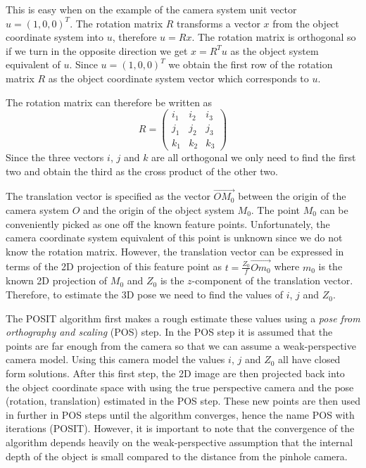 \documentclass[11pt,a4paper]{report}
\begin{document}
This is easy when on the
example of the camera system unit vector $u = (1,0,0)^T$. The rotation matrix
$R$ transforms a vector $x$ from the object coordinate system into $u$,
therefore $u = Rx$. The rotation matrix is orthogonal so if we turn in the
opposite direction we get $x = R^Tu$ as the object system equivalent of $u$. Since $u = (1,0,0)^T$ we obtain the first
row of the rotation matrix $R$ as the object coordinate system vector which
corresponds to $u$.

The rotation matrix can therefore be written as
\begin{equation}
R = \begin{pmatrix}i_1&i_2&i_3\\j_1&j_2&j_3\\k_1&k_2&k_3\end{pmatrix}
\end{equation}
Since the three vectors $i$, $j$ and $k$ are all orthogonal we only need to find the
first two and obtain the third as the cross product of the other two.

The translation vector is specified as the vector $\overrightarrow{OM_0}$ between the
origin of the camera system $O$ and the origin of the object system $M_0$. The
point $M_0$ can be conveniently picked as one off the known feature
points. Unfortunately, the
camera coordinate system equivalent of this point is unknown since we do not
know the rotation matrix. However, the translation vector can be expressed in
terms of the 2D projection of this feature point
as $t = \frac{Z_0}{f}\overrightarrow{Om_0}$ where $m_0$ is the known 2D projection of $M_0$
and $Z_0$ is the $z$-component of the translation vector. Therefore, to estimate
the 3D pose we need to find the values of $i$, $j$ and $Z_0$.

The POSIT algorithm first makes a rough estimate these values using a \textit{pose from
  orthography and scaling} (POS) step. In the POS step it is assumed that the
points are far enough from the camera so that we can assume a weak-perspective
camera model. Using this camera model the values $i$, $j$ and $Z_0$ all have
closed form solutions. After this first step, the 2D image are then projected back into the object
coordinate space with using the true perspective camera and the pose (rotation,
translation) estimated in the POS step. These new points are then used in further
in POS steps until the algorithm converges, hence the name POS with iterations
(POSIT). However, it is important to note that the convergence of the algorithm
depends heavily on the weak-perspective assumption that the internal depth of
the object is small compared to the distance from the pinhole camera.
\end{document}
